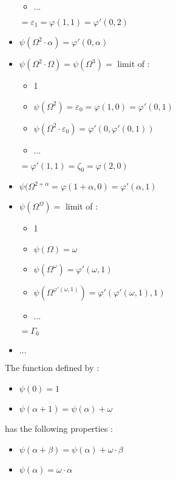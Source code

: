 \documentclass[10pt]{article}
\begin{document}
\begin{itemize}
\begin{itemize}
   \item \( \ldots \)
   \end{itemize}
   \( = \varepsilon_1 = \varphi(1,1) = \varphi'(0,2) \)
\item \( \psi(\Omega^2 \cdot \alpha) = \varphi'(0,\alpha) \)
\item \( \psi(\Omega^2 \cdot \Omega) = \psi(\Omega^3) = \) limit of :
   \begin{itemize}
     \setlength{\itemsep}{1pt}
     \setlength{\parskip}{0pt}
     \setlength{\parsep}{0pt}
   \item 1
   \item \( \psi(\Omega^2) = \varepsilon_0 = \varphi(1,0) = \varphi'(0,1) \)
   \item \( \psi(\Omega^2 \cdot \varepsilon_0) = \varphi'(0,\varphi'(0,1)) \)
   \item \( \ldots \)
   \end{itemize}
   \( = \varphi'(1,1) = \zeta_0 = \varphi(2,0) \)
\item \( \psi(\Omega^{2+\alpha} = \varphi(1+\alpha,0) = \varphi'(\alpha,1) \)
\item \( \psi(\Omega^\Omega) = \) limit of : 
   \begin{itemize}
     \setlength{\itemsep}{1pt}
     \setlength{\parskip}{0pt}
     \setlength{\parsep}{0pt}
   \item 1
   \item \( \psi(\Omega) = \omega \)
   \item \( \psi(\Omega^\omega) = \varphi'(\omega,1) \)
   \item \( \psi(\Omega^{\varphi'(\omega,1)}) = \varphi'(\varphi'(\omega,1),1) \)
   \item \( \ldots \)
   \end{itemize} 
   \( = \Gamma_0 \)
\item \( \ldots \)
\end{itemize}

\bigskip

The function defined by :

\begin{itemize}
     \setlength{\itemsep}{1pt}
     \setlength{\parskip}{0pt}
     \setlength{\parsep}{0pt}
\item \( \psi(0) = 1 \)
\item \( \psi(\alpha+1) = \psi(\alpha)+\omega \)
\end{itemize}

has the following properties :

\begin{itemize}
     \setlength{\itemsep}{1pt}
     \setlength{\parskip}{0pt}
     \setlength{\parsep}{0pt}
\item \( \psi(\alpha+\beta)=\psi(\alpha)+\omega \cdot \beta \)
\item \( \psi(\alpha) = \omega \cdot \alpha \)
\end{itemize}
\end{document}
